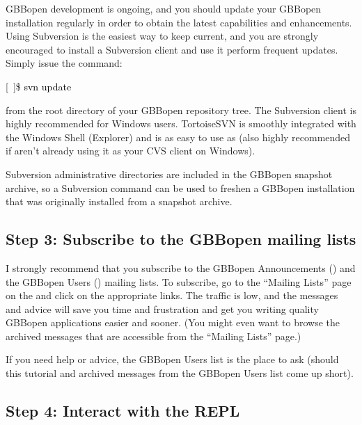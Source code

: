 \documentclass[10pt,twoside,english,pdftex]{article}
\begin{document}
%
%
%
%
%
GBBopen development is ongoing, and you should update your GBBopen
installation regularly in order to obtain the latest capabilities and
enhancements.  Using Subversion is the easiest way to keep current, and you
are strongly encouraged to install a Subversion client and use it perform
frequent updates.  Simply issue the command:
%
\W\supp
\begin{example}
\textcolor{darkergray}{%
  [~]\$ \textcolor{black}{svn update}}
\end{example}
%
from the root directory of your GBBopen repository tree.  
The  Subversion
client is highly recommended for Windows users.  TortoiseSVN is
smoothly integrated with the Windows Shell (Explorer) and is as easy
to use as  (also
highly recommended if aren't already using it as your CVS client on
Windows).

Subversion  administrative directories are included in the
GBBopen snapshot archive, so a Subversion  command can be
used to freshen a GBBopen installation that was originally installed
from a snapshot archive.

\subsection*{Step 3: Subscribe to the GBBopen mailing lists}

%
I strongly recommend that you subscribe to the GBBopen Announcements
() and the GBBopen Users () mailing
lists.  To subscribe, go to the ``Mailing Lists'' page on the
 and click on the appropriate
 links.  The traffic is low, and the messages and advice will
save you time and frustration and get you writing quality GBBopen applications
easier and sooner.  (You might even want to browse the archived messages that
are accessible from the ``Mailing Lists'' page.)

If you need help or advice, the GBBopen Users list is the place to ask (should
this tutorial and archived messages from the GBBopen Users list come up
short).

\subsection*{Step 4: Interact with the REPL}
\end{document}
